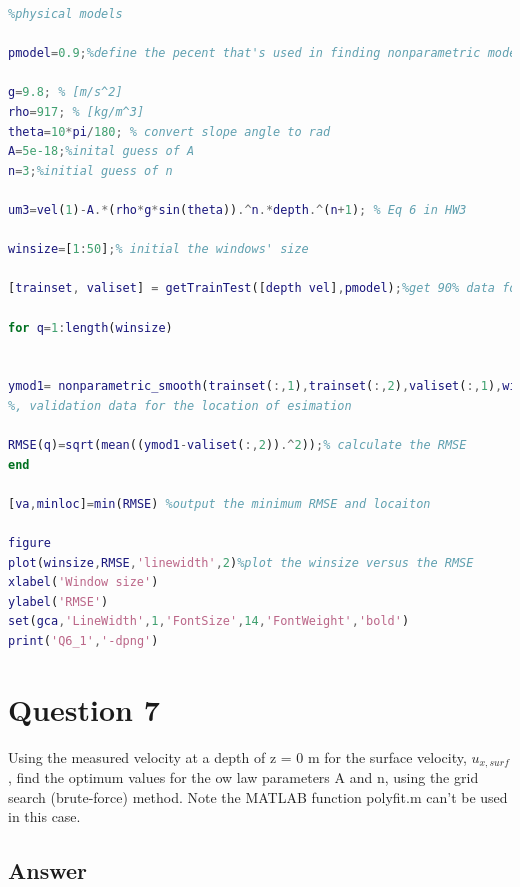 \documentclass[
	12pt, %
]{fphw}
\begin{document}
\begin{lstlisting}[language=Matlab,escapeinside=``]
%first approach that I use the RMSE between the nonparametric models with
%physical models

pmodel=0.9;%define the pecent that's used in finding nonparametric models

g=9.8; % [m/s^2]
rho=917; % [kg/m^3]
theta=10*pi/180; % convert slope angle to rad
A=5e-18;%inital guess of A
n=3;%initial guess of n

um3=vel(1)-A.*(rho*g*sin(theta)).^n.*depth.^(n+1); % Eq 6 in HW3

winsize=[1:50];% initial the windows' size

[trainset, valiset] = getTrainTest([depth vel],pmodel);%get 90% data for model and 10% for validation

for q=1:length(winsize)


ymod1= nonparametric_smooth(trainset(:,1),trainset(:,2),valiset(:,1),winsize(q));%using a weighted moving window average
%, validation data for the location of esimation

RMSE(q)=sqrt(mean((ymod1-valiset(:,2)).^2));% calculate the RMSE
end

[va,minloc]=min(RMSE) %output the minimum RMSE and locaiton

figure
plot(winsize,RMSE,'linewidth',2)%plot the winsize versus the RMSE
xlabel('Window size')
ylabel('RMSE')
set(gca,'LineWidth',1,'FontSize',14,'FontWeight','bold')
print('Q6_1','-dpng')

\end{lstlisting} 






\section*{Question 7 }

\begin{problem}
Using the measured velocity at a depth of z = 0 m for the surface velocity, $u_{x,surf}$, find the optimum values
for the 
ow law parameters A and n, using the grid search (brute-force) method. Note the MATLAB function
polyfit.m can't be used in this case.
	
\end{problem}


\subsection*{Answer}
\end{document}
